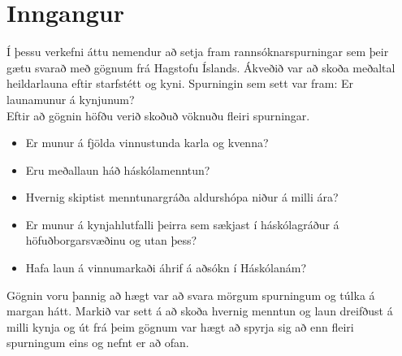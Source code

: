 \documentclass[12pt, git, draft]{rureport}
\begin{document}
\maketitle  %



\section{Inngangur} %

Í þessu verkefni áttu nemendur að setja fram rannsóknarspurningar sem þeir gætu svarað með gögnum frá Hagstofu Íslands\cite{H}. 
Ákveðið var að skoða meðaltal heildarlauna eftir starfstétt og kyni.
Spurningin sem sett var fram: Er launamunur á kynjunum?
\\
Eftir að gögnin höfðu verið skoðuð vöknuðu fleiri spurningar.
\begin{itemize} 
	\item Er munur á fjölda vinnustunda karla og kvenna?
	\item Eru meðallaun háð háskólamenntun?
	\item Hvernig skiptist menntunargráða aldurshópa niður á milli ára?
	\item Er munur á kynjahlutfalli þeirra sem sækjast í háskólagráður á höfuðborgarsvæðinu og utan þess?
	\item Hafa laun á vinnumarkaði áhrif á aðsókn í Háskólanám?
\end{itemize}


Gögnin voru þannig að hægt var að svara mörgum spurningum og túlka á margan hátt. Markið var sett á að skoða hvernig menntun og laun dreifðust á milli kynja og út frá þeim gögnum var hægt að spyrja sig að enn fleiri spurningum eins og nefnt er að ofan.

\end{document}
